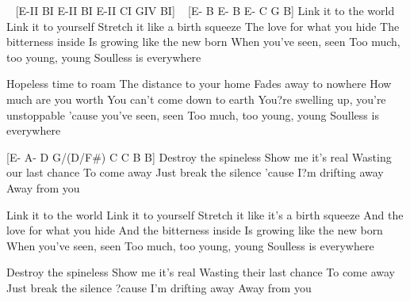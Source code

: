 

\begin{guitar}
 ~
[E-II BI E-II BI E-II CI GIV BI] ~
[E- B E- B E- C G B]
	 Link it to the world
Link it to yourself
Stretch it like a birth squeeze
The love for what you hide
The bitterness inside
Is growing like the new born
When you've seen, seen
Too much, too young, young
Soulless is everywhere

Hopeless time to roam
The distance to your home
Fades away to nowhere
How much are you worth
You can't come down to earth
You?re swelling up, you're unstoppable
'cause you've seen, seen
Too much, too young, young
Soulless is everywhere

[E- A- D G/(D/F#) C C B B]
Destroy the spineless
Show me it's real
Wasting our last chance
To come away
Just break the silence
'cause I?m drifting away
Away from you

Link it to the world
Link it to yourself
Stretch it like it's a birth squeeze
And the love for what you hide
And the bitterness inside
Is growing like the new born
When you've seen, seen
Too much, too young, young
Soulless is everywhere

Destroy the spineless
Show me it's real
Wasting their last chance
To come away
Just break the silence
?cause I'm drifting away
Away from you



\end{guitar}